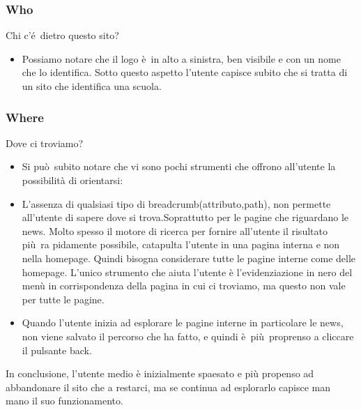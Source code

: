 \documentclass[12pt]{article}
\begin{document}
\subsubsection{Who} Chi c'\'e\ dietro questo sito?
\begin{itemize}
	\item Possiamo notare che il logo \`e\ in alto a sinistra, ben visibile e con un nome che lo identifica. Sotto questo aspetto l'utente capisce subito che si tratta di  un sito che identifica una scuola.
\end{itemize}
\subsubsection{Where} Dove ci troviamo?
\begin{itemize}
	\item Si pu\`o\ subito notare che vi sono pochi strumenti che offrono all'utente la possibilit\`a di orientarsi:

	\item L'assenza di qualsiasi tipo di breadcrumb(attributo,path), non permette all'utente di sapere dove si trova.Soprattutto per le pagine che riguardano le news. Molto spesso il motore di ricerca per fornire all'utente il risultato pi\`u\  ra pidamente possibile, catapulta l'utente in una pagina interna e non nella homepage. Quindi bisogna considerare tutte le pagine interne come delle homepage.
	L'unico strumento che aiuta l'utente \`e l'evidenziazione in nero del men\`u in corrispondenza della pagina in cui ci troviamo, ma questo non vale per tutte le pagine.

	\item Quando l'utente inizia ad esplorare le pagine interne in particolare le news, non viene salvato il percorso che ha fatto, e quindi \`e\ pi\`u\ proprenso a cliccare il pulsante back.
\end{itemize}
In conclusione, l'utente medio \`e inizialmente spaesato e pi\`u propenso ad abbandonare il sito che a restarci, ma se continua ad esplorarlo capisce man mano il suo funzionamento.
\end{document}
